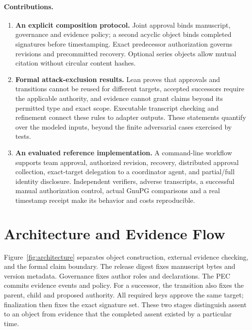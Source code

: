 \documentclass[conference,compsoc]{IEEEtran}
\begin{document}
\paragraph{Contributions.}
\begin{enumerate}
  \item \textbf{An explicit composition protocol.}
  Joint approval binds manuscript, governance and evidence policy; a second
  acyclic object binds completed signatures before timestamping. Exact
  predecessor authorization governs revisions and precommitted recovery.
  Optional series objects allow mutual citation without circular content hashes.
  \item \textbf{Formal attack-exclusion results.}
  Lean proves that approvals and transitions cannot be reused for different
  targets, accepted successors require the applicable authority, and evidence
  cannot grant claims beyond its permitted type and exact scope. Executable
  transcript checking and refinement connect these rules to adapter outputs.
  These statements quantify over the modeled inputs, beyond the finite
  adversarial cases exercised by tests.
  \item \textbf{An evaluated reference implementation.}
  A command-line workflow supports team approval, authorized revision, recovery,
  distributed approval collection, exact-target delegation to a coordinator
  agent, and partial/full identity disclosure. Independent verifiers, adverse
  transcripts, a successful manual authorization control, actual GnuPG
  comparisons and a real timestamp receipt make its behavior and costs
  reproducible.
\end{enumerate}

\section{Architecture and Evidence Flow}
\label{sec:architecture}

Figure~\ref{fig:architecture} separates object construction, external evidence
checking, and the formal claim boundary. The release digest fixes manuscript
bytes and version metadata. Governance fixes author roles and declarations.
The PEC commits evidence events and policy. For a successor, the transition
also fixes the parent, child and proposed authority. All required keys approve
the same target; finalization then fixes the exact signature set.
These two stages distinguish assent to an object from evidence that the
completed assent existed by a particular time.
\end{document}
